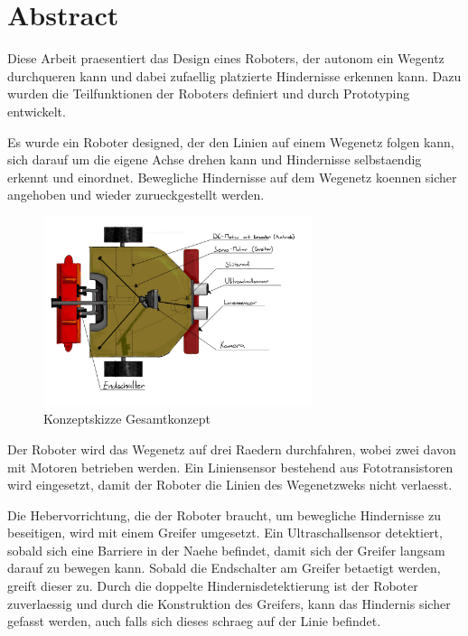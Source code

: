 \section*{Abstract}

Diese Arbeit praesentiert das Design eines Roboters, der autonom ein Wegentz durchqueren kann und dabei zufaellig platzierte Hindernisse erkennen kann. Dazu wurden die Teilfunktionen der Roboters definiert und durch Prototyping entwickelt.

Es wurde ein Roboter designed, der den Linien auf einem Wegenetz folgen kann, sich darauf um die eigene Achse drehen kann und Hindernisse selbstaendig erkennt und einordnet. Bewegliche Hindernisse auf dem Wegenetz koennen sicher angehoben und wieder zurueckgestellt werden.

\begin{figure}[H]
\centering
\includegraphics[width=0.7\textwidth]{assets/gesamtkonzept/Skizze-Fahrzeugkonzept-Beschriftet.jpg}
\caption{Konzeptskizze Gesamtkonzept}
\label{fig:robot_concept-scetch_labeld-abstract}
\end{figure}

Der Roboter wird das Wegenetz auf drei Raedern durchfahren, wobei zwei davon mit Motoren betrieben werden. Ein Liniensensor bestehend aus Fototransistoren wird eingesetzt, damit der Roboter die Linien des Wegenetzweks nicht verlaesst.

Die Hebervorrichtung, die der Roboter braucht, um bewegliche Hindernisse zu beseitigen, wird mit einem Greifer umgesetzt. Ein Ultraschallsensor detektiert, sobald sich eine Barriere in der Naehe befindet, damit sich der Greifer langsam darauf zu bewegen kann. Sobald die Endschalter am Greifer betaetigt werden, greift dieser zu. Durch die doppelte Hindernisdetektierung ist der Roboter zuverlaessig und durch die Konstruktion des Greifers, kann das Hindernis sicher gefasst werden, auch falls sich dieses schraeg auf der Linie befindet.

